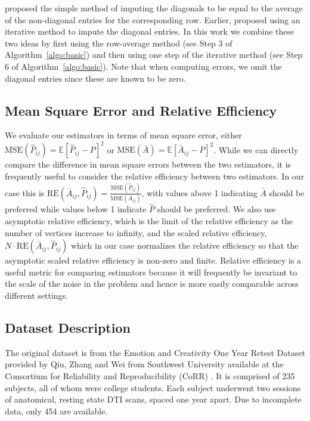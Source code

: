 \documentclass[10pt,letterpaper]{article}
\newcommand{\Ex}{\mathbb{E}}
\begin{document}
\citet{marchette2011vertex}  proposed the simple method of imputing the diagonals to be equal to the average of the non-diagonal entries for the corresponding row.
Earlier, \citet{scheinerman2010modeling} proposed using an iterative method to impute the diagonal entries.
In this work we combine these two ideas by first using the row-average method  (see Step 3 of Algorithm~\ref{algo:basic}) and then using one step of the iterative method (see Step 6 of Algorithm~\ref{algo:basic}).
Note that when computing errors, we omit the diagonal entries since these are known to be zero.

\subsection{Mean Square Error and Relative Efficiency}
\label{section:rel_eff}
We evaluate our estimators in terms of mean square error, either $\mathrm{MSE}(\hat{P}_{ij})=\Ex[\hat{P}_{ij}-P]^2$ or $\mathrm{MSE}(\bar{A})=\Ex[\bar{A}_{ij}-P]^2$.
While we can directly compare the difference in mean square errors between the two estimators, it is frequently useful to consider the relative efficiency between two estimators.
In our case this is $\mathrm{RE}(\bar{A}_{ij},\hat{P}_{ij}) = \frac{\mathrm{MSE}(\hat{P}_{ij})}{\mathrm{MSE}(\bar{A}_{ij})}$, with values above 1 indicating $\bar{A}$ should be preferred while values below 1 indicate $\hat{P}$ should be preferred.
We also use asymptotic relative efficiency, which is the limit of the relative efficiency as the number of vertices increase to infinity, and the scaled relative efficiency, $N\cdot \mathrm{RE}(\bar{A}_{ij},\hat{P}_{ij}) $ which in our case normalizes the relative efficiency so that the asymptotic scaled relative efficiency is non-zero and finite.
Relative efficiency is a useful metric for comparing estimators because it will frequently be invariant to the scale of the noise in the problem and hence is more easily comparable across different settings.

\subsection{Dataset Description}
\label{section:data}
The original dataset is from the Emotion and Creativity One Year Retest Dataset provided by Qiu, Zhang and Wei from Southwest University available at the Consortium for Reliability and Reproducibility (CoRR) \cite{zuo2014open, gorgolewski2015high}. It is comprised of 235 subjects, all of whom were college students. Each subject underwent two sessions of anatomical, resting state DTI scans, spaced one year apart. Due to incomplete data, only 454 are available.
\end{document}
